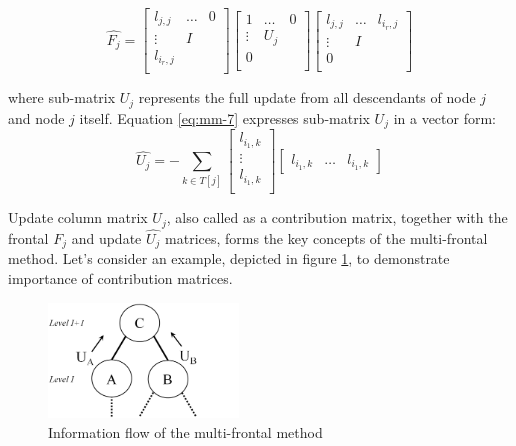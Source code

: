 \begin{equation} \label{eq:mm-6}
\hat{F_{j}} = \begin{bmatrix}
l_{j,j} & \dots & 0 \\
\vdots & I \\
l_{i_{r},j} \\
\end{bmatrix} 
\begin{bmatrix}
1 & \dots & 0 \\
\vdots & U_{j} \\
0 \\
\end{bmatrix} 
\begin{bmatrix}
l_{j,j} & \dots & l_{i_{r},j} \\
\vdots & I \\
0 \\
\end{bmatrix} 
\end{equation}

where sub-matrix $U_{j}$ represents the full update from all descendants of node $j$ and node $j$ itself. Equation \ref{eq:mm-7} expresses sub-matrix $U_{j}$ in a vector form: \\

\begin{equation} \label{eq:mm-7}
\hat{U_{j}} = - \sum_{k \in T[j]}  \begin{bmatrix}
l_{i_1,k} \\
\vdots \\
l_{i_1,k} \\
\end{bmatrix} \begin{bmatrix}
l_{i_1,k} & \dots & l_{i_1,k}
\end{bmatrix}
\end{equation}


Update column matrix $U_{j}$, also called as a contribution matrix, together with the frontal $F_{j}$ and update $\hat{U_j}$ matrices, forms the key concepts of the multi-frontal method. Let's consider an example, depicted in figure \ref{fig:information-float}, to demonstrate importance of contribution matrices.\\



\figpointer{\ref{fig:information-float}}
\begin{figure}[htpb]
  \centering
  \includegraphics[width=0.45\textwidth]{figures/chapter-2/information-flow.png}
\caption{Information flow of the multi-frontal method}
\label{fig:information-float}
\end{figure}


